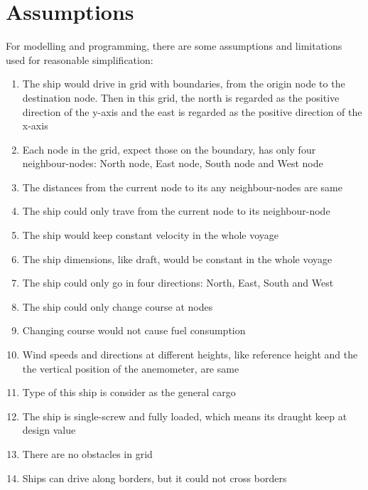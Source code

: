 \section{Assumptions}
\label{ass}
For modelling and programming, there are some assumptions and limitations used for reasonable simplification:
\begin{enumerate}[(1)]
    \item \label{A1} The ship would drive in grid with boundaries, from the origin node to the destination node. Then in this grid, the north is regarded as the positive direction of the y-axis and the east is regarded as the positive direction of the x-axis
    \item \label{A2} Each node in the grid, expect those on the boundary, has only four neighbour-nodes: North node, East node, South node and West node
    \item \label{A3} The distances from the current node to its any neighbour-nodes are same 
    \item \label{A4} The ship could only trave from the current node to its neighbour-node
    \item \label{A5} The ship would keep constant velocity in the whole voyage
    \item \label{A6} The ship dimensions, like draft, would be constant in the whole voyage
    \item \label{A7} The ship could only go in four directions: North, East, South and West
    \item \label{A8} The ship could only change course at nodes
    \item \label{A9} Changing course would not cause fuel consumption
    \item \label{A10} Wind speeds and directions at different heights, like reference height and the the vertical position of the anemometer, are same
    \item \label{A11} Type of this ship is consider as the general cargo
    \item \label{A12} The ship is single-screw and fully loaded, which means its draught keep at design value
    \item \label{A13} There are no obstacles in grid
    \item \label{A14} Ships can drive along borders, but it could not cross borders
\end{enumerate}

